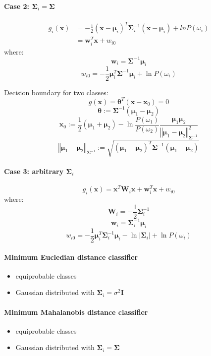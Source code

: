 \documentclass{article}
\begin{document}
\begin{multicols}{2}
\paragraph{Case 2: $\symbf{\Sigma}_i = \symbf{\Sigma}$}
\[\begin{split}
	g_i(\symbf{x}) &= -\frac{1}{2} (\symbf{x} - \symbf{\mu}_i)^T \symbf{\Sigma}_i^{-1} (\symbf{x} - \symbf{\mu}_i) + ln P(\omega_i) \\
	&= \symbf{w}_i^T \symbf{x} + w_{i0}
\end{split}\]
where:
\[\symbf{w}_i = \symbf{\Sigma}^{-1} \symbf{\mu}_i\]
\[w_{i0} = -\frac{1}{2}\symbf{\mu}_i^T \symbf{\Sigma}^{-1} \symbf{\mu}_i + \ln P(\omega_i) \]

Decision boundary for two classes:
\[g(\symbf{x}) = \symbf{\theta}^T (\symbf{x} - \symbf{x}_0) = 0\]
\[\symbf{\theta} := \symbf{\Sigma}^{-1} (\symbf{\mu}_1 - \symbf{\mu}_2)\]
\[\symbf{x}_0 := \frac{1}{2} (\symbf{\mu}_1 + \symbf{\mu}_2) - \ln \frac{P(\omega_1)}{P(\omega_2)} \frac{\symbf{\mu}_1 \symbf{\mu}_2}{\left\Vert \symbf{\mu}_1 - \symbf{\mu}_2 \right\Vert_{\symbf{\Sigma}^{-1}}^2}\]
\[\left\Vert \symbf{\mu}_1 - \symbf{\mu}_2 \right\Vert_{\symbf{\Sigma}^{-1}} := \sqrt{(\symbf{\mu}_1 - \symbf{\mu}_2)^T \symbf{\Sigma}^{-1} (\symbf{\mu}_1 - \symbf{\mu}_2)}\]

\paragraph{Case 3: arbitrary $\symbf{\Sigma}_i$}
\[g_i(\symbf{x}) = \symbf{x}^T \symbf{W}_i \symbf{x} + \symbf{w}_i^T \symbf{x} + w_{i0}\]
where:
\[\symbf{W}_i = -\frac{1}{2}\symbf{\Sigma}_i^{-1}\]
\[\symbf{w}_i = \symbf{\Sigma}_i^{-1} \symbf{\mu}_i\]
\[w_{i0} = -\frac{1}{2}\symbf{\mu}_i^T \symbf{\Sigma}_i^{-1} \symbf{\mu}_i - \ln |\symbf{\Sigma}_i| + \ln P(\omega_i) \]

\paragraph{Minimum Eucledian distance classifier}
\begin{itemize}
	\item equiprobable classes
	\item Gaussian distributed with $\symbf{\Sigma}_i = \sigma^2 \symbf{I}$
\end{itemize}

\paragraph{Minimum Mahalanobis distance classifier}
\begin{itemize}
	\item equiprobable classes
	\item Gaussian distributed with $\symbf{\Sigma}_i = \symbf{\Sigma}$
\end{itemize}


\end{multicols}
\end{document}
